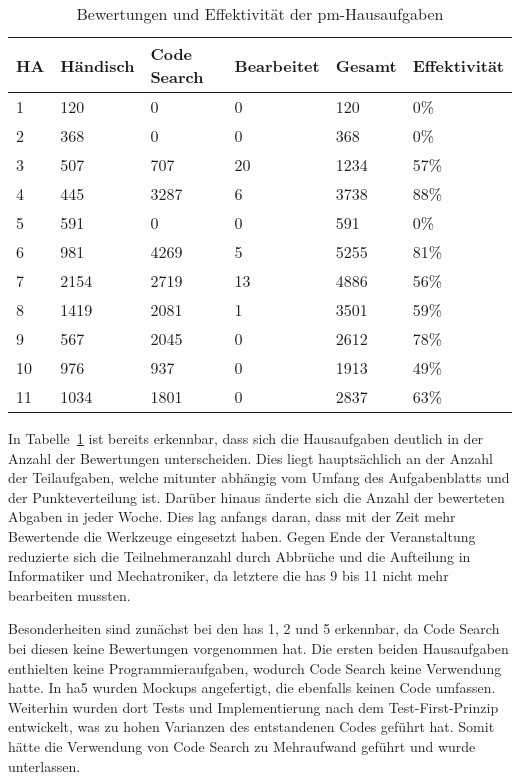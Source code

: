 \begin{table}
    \centering
    \caption{Bewertungen und Effektivität der \ac{pm}-Hausaufgaben}
    \begin{tabular}{|l|l|l|l|l|l|}
    \hline
        HA  & Händisch & Code Search & Bearbeitet & Gesamt & Effektivität  \\ \hline
        1   & 120  & 0    & 0  & 120  &  0\%  \\ \hline
        2   & 368  & 0    & 0  & 368  &  0\%  \\ \hline
        3   & 507  & 707  & 20 & 1234 & 57\%  \\ \hline
        4   & 445  & 3287 & 6  & 3738 & 88\%  \\ \hline
        5   & 591  & 0    & 0  & 591  &  0\%  \\ \hline
        6   & 981  & 4269 & 5  & 5255 & 81\%  \\ \hline
        7   & 2154 & 2719 & 13 & 4886 & 56\%  \\ \hline
        8   & 1419 & 2081 & 1  & 3501 & 59\%  \\ \hline
        9   & 567  & 2045 & 0  & 2612 & 78\%  \\ \hline
        10  & 976  & 937  & 0  & 1913 & 49\%  \\ \hline
        11  & 1034 & 1801 & 0  & 2837 & 63\%  \\ \hline
    \end{tabular}
    \label{tbl:pm-effectiveness}
\end{table}

In Tabelle~\ref{tbl:pm-effectiveness} ist bereits erkennbar, dass sich die Hausaufgaben deutlich in der Anzahl der Bewertungen unterscheiden.
Dies liegt hauptsächlich an der Anzahl der Teilaufgaben, welche mitunter abhängig vom Umfang des Aufgabenblatts und der Punkteverteilung ist.
Darüber hinaus änderte sich die Anzahl der bewerteten Abgaben in jeder Woche.
Dies lag anfangs daran, dass mit der Zeit mehr Bewertende die Werkzeuge eingesetzt haben.
Gegen Ende der Veranstaltung reduzierte sich die Teilnehmeranzahl durch Abbrüche und die Aufteilung in Informatiker und Mechatroniker, da letztere die \acp{ha} 9 bis 11 nicht mehr bearbeiten mussten.

Besonderheiten sind zunächst bei den \acp{ha} 1, 2 und 5 erkennbar, da Code Search bei diesen keine Bewertungen vorgenommen hat.
Die ersten beiden Hausaufgaben enthielten keine Programmieraufgaben, wodurch Code Search keine Verwendung hatte.
In \ac{ha}5 wurden Mockups angefertigt, die ebenfalls keinen Code umfassen.
Weiterhin wurden dort Tests und Implementierung nach dem Test-First-Prinzip entwickelt, was zu hohen Varianzen des entstandenen Codes geführt hat.
Somit hätte die Verwendung von Code Search zu Mehraufwand geführt und wurde unterlassen.

